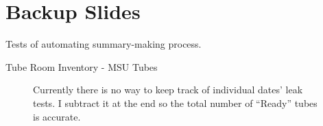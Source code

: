 \documentclass{beamer}
\begin{document}
\section*{Backup Slides}
	\appendix
	\begin{frame}
		Tests of automating summary-making process.
	\end{frame}
	\begin{frame}{Tube Room Inventory - MSU Tubes}
		\begin{figure}
			\centering
			\scalebox{0.6}{}
			\caption{Currently there is no way to keep track of individual dates' leak tests. I subtract it at the end so the total number of ``Ready'' tubes is accurate.}
		\end{figure}
		\centering
	\end{frame}
\end{document}
